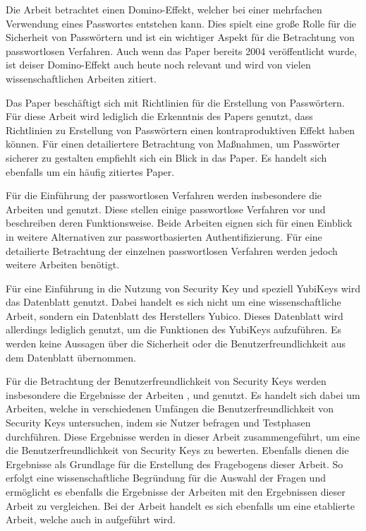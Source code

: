 Die Arbeit \cite{ives2004domino} betrachtet einen Domino-Effekt, welcher bei einer mehrfachen Verwendung eines Passwortes entstehen kann. Dies spielt eine große Rolle für die Sicherheit von Passwörtern und ist ein wichtiger Aspekt für die Betrachtung von passwortlosen Verfahren. Auch wenn das Paper bereits 2004 veröffentlicht wurde, ist deiser Domino-Effekt auch heute noch relevant und wird von vielen wissenschaftlichen Arbeiten zitiert.

Das Paper \cite{yildirim2019encouraging} beschäftigt sich mit Richtlinien für die Erstellung von Passwörtern. Für diese Arbeit wird lediglich die Erkenntnis des Papers genutzt, dass Richtlinien zu Erstellung von Passwörtern einen kontraproduktiven Effekt haben können. Für einen detailiertere Betrachtung von Maßnahmen, um Passwörter sicherer zu gestalten empfiehlt sich ein Blick in das Paper. Es handelt sich ebenfalls um ein häufig zitiertes Paper.

Für die Einführung der passwortlosen Verfahren werden insbesondere die Arbeiten \cite{chowhan2019password} und \cite{parmar2022comprehensive} genutzt. Diese stellen einige passwortlose Verfahren vor und beschreiben deren Funktionsweise. Beide Arbeiten eignen sich für einen Einblick in weitere Alternativen zur passwortbasierten Authentifizierung. Für eine detailierte Betrachtung der einzelnen passwortlosen Verfahren werden jedoch weitere Arbeiten benötigt.

Für eine Einführung in die Nutzung von Security Key und speziell YubiKeys wird das Datenblatt \cite{yuibkey2023fido2} genutzt. Dabei handelt es sich nicht um eine wissenschaftliche Arbeit, sondern ein Datenblatt des Herstellers Yubico. Dieses Datenblatt wird allerdings lediglich genutzt, um die Funktionen des YubiKeys aufzuführen. Es werden keine Aussagen über die Sicherheit oder die Benutzerfreundlichkeit aus dem Datenblatt übernommen.

Für die Betrachtung der Benutzerfreundlichkeit von Security Keys werden insbesondere die Ergebnisse der Arbeiten \cite{farke2020you}, \cite{lyastani2020fido2} und \cite{reynolds2018tale} genutzt. Es handelt sich dabei um Arbeiten, welche in verschiedenen Umfängen die Benutzerfreundlichkeit von Security Keys untersuchen, indem sie Nutzer befragen und Testphasen durchführen. Diese Ergebnisse werden in dieser Arbeit zusammengeführt, um eine die Benutzerfreundlichkeit von Security Keys zu bewerten. Ebenfalls dienen die Ergebnisse als Grundlage für die Erstellung des Fragebogens dieser Arbeit. So erfolgt eine wissenschaftliche Begründung für die Auswahl der Fragen und ermöglicht es ebenfalls die Ergebnisse der Arbeiten mit den Ergebnissen dieser Arbeit zu vergleichen. Bei der Arbeit \cite{reynolds2018tale} handelt es sich ebenfalls um eine etablierte Arbeit, welche auch in \cite{lyastani2020fido2} aufgeführt wird. 

